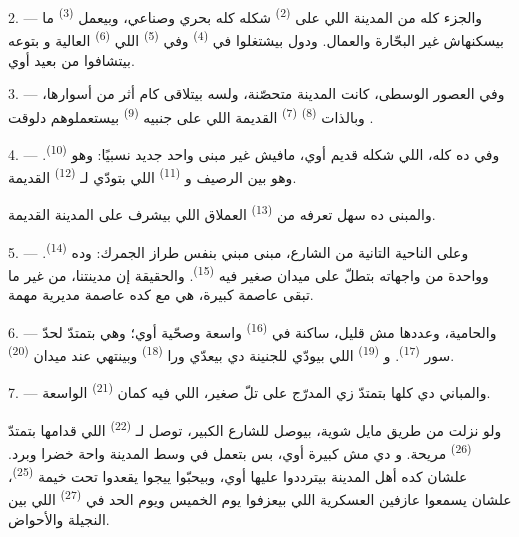 2. --- والجزء كله من المدينة اللي على  \textsuperscript{(2)} شكله كله
بحري وصناعي، وبيعمل  \textsuperscript{(3)} ما بيسكنهاش غير البحّارة
والعمال. ودول بيشتغلوا في  \textsuperscript{(4)} وفي  \textsuperscript{(5)} اللي  \textsuperscript{(6)} العالية
و بتوعه بيتشافوا من بعيد أوي.

3. --- وفي العصور الوسطى، كانت المدينة متحصّنة، ولسه بيتلاقى كام أثر من
أسوارها، وبالذات  \textsuperscript{(8)}  \textsuperscript{(7)}
القديمة اللي على جنبيه  \textsuperscript{(9)} بيستعملوهم دلوقت
.

4. --- وفي  ده كله، اللي شكله قديم أوي، مافيش غير مبنى واحد جديد
نسبيًا: وهو  \textsuperscript{(10)}. وهو بين الرصيف و
\textsuperscript{(11)} اللي بتودّي لـ \textsuperscript{(12)} القديمة.

والمبنى ده سهل تعرفه من  \textsuperscript{(13)} العملاق اللي
بيشرف على المدينة القديمة.

5. --- وعلى الناحية التانية من الشارع،  مبنى مبني بنفس طراز الجمرك:
وده  \textsuperscript{(14)}. وواحدة من واجهاته بتطلّ على ميدان صغير
فيه  \textsuperscript{(15)}. والحقيقة إن مدينتنا، من غير ما تبقى
عاصمة كبيرة، هي مع كده عاصمة مديرية مهمة.

\VUsaut{5.0mm}
\VUsaut{3.4mm}

6. --- والحامية، وعددها مش قليل، ساكنة في  \textsuperscript{(16)}
واسعة وصحّية أوي؛ وهي بتمتدّ لحدّ سور  \textsuperscript{(17)}.
و \textsuperscript{(19)} اللي بيودّي للجنينة دي بيعدّي ورا
 \textsuperscript{(18)} وبينتهي عند ميدان 
\textsuperscript{(20)}.

7. --- والمباني دي كلها بتمتدّ زي المدرّج على تلّ صغير، اللي فيه كمان
 \textsuperscript{(21)} الواسعة.

ولو نزلت من طريق مايل شوية، بيوصل للشارع الكبير، توصل لـ
\textsuperscript{(22)} اللي قدامها بتمتدّ  \textsuperscript{(26)}
مريحة. و دي مش كبيرة أوي، بس بتعمل في وسط المدينة واحة خضرا
وبرد. علشان كده أهل المدينة بيترددوا عليها أوي، وبيحبّوا ييجوا يقعدوا تحت خيمة
 \textsuperscript{(25)}، علشان يسمعوا عازفين العسكرية اللي بيعزفوا يوم
الخميس ويوم الحد في  \textsuperscript{(27)} اللي بين النجيلة والأحواض.

